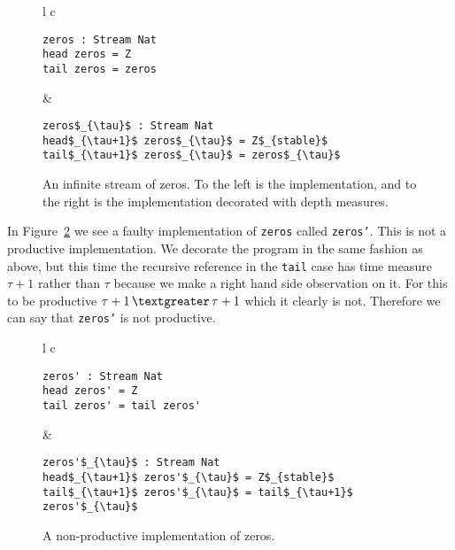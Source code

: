 \begin{figure}
\begin{tabular}{l c}

\begin{minipage}{3in}
\begin{Verbatim}[commandchars=\\\{\},codes={\catcode`$=3\catcode`_=8}]
zeros : Stream Nat
head zeros = Z
tail zeros = zeros
\end{Verbatim}
\end{minipage} &
\begin{minipage}{3in}
\begin{Verbatim}[commandchars=\\\{\},codes={\catcode`$=3\catcode`_=8}]
zeros$_{\tau}$ : Stream Nat
head$_{\tau+1}$ zeros$_{\tau}$ = Z$_{stable}$
tail$_{\tau+1}$ zeros$_{\tau}$ = zeros$_{\tau}$
\end{Verbatim}
\end{minipage}

\end{tabular}
\caption{An infinite stream of zeros. To the left is the implementation, and to the right is the implementation decorated with depth measures.}
\label{fig:zeros}
\end{figure}

In Figure~\ref{fig:zerosprime} we see a faulty implementation of \texttt{zeros} called \texttt{zeros'}. This is not a productive implementation. We decorate the program in the same fashion as above, but this time the recursive reference in the \texttt{tail} case has time measure $\tau+1$ rather than $\tau$ because we make a right hand side observation on it. For this to be productive $\tau+1\,\textgreater\,\tau+1$ which it clearly is not. Therefore we can say that \texttt{zeros'} is not productive.

\begin{figure}
\begin{tabular}{l c}

\begin{minipage}{3in}
\begin{Verbatim}[commandchars=\\\{\},codes={\catcode`$=3\catcode`_=8}]
zeros' : Stream Nat
head zeros' = Z
tail zeros' = tail zeros'
\end{Verbatim}
\end{minipage} &
\begin{minipage}{3in}
\begin{Verbatim}[commandchars=\\\{\},codes={\catcode`$=3\catcode`_=8}]
zeros'$_{\tau}$ : Stream Nat
head$_{\tau+1}$ zeros'$_{\tau}$ = Z$_{stable}$
tail$_{\tau+1}$ zeros'$_{\tau}$ = tail$_{\tau+1}$ zeros'$_{\tau}$
\end{Verbatim}
\end{minipage}

\end{tabular}
\caption{A non-productive implementation of zeros.}
\label{fig:zerosprime}
\end{figure}

